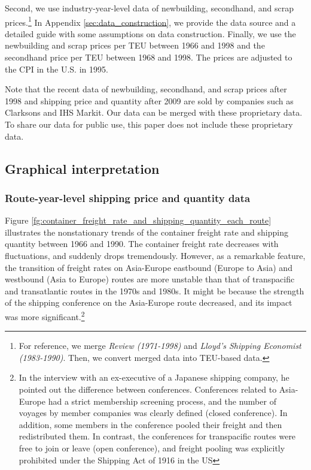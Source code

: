 \documentclass[11pt]{article}
\begin{document}
Second, we use industry-year-level data of newbuilding, secondhand, and scrap prices.\footnote{For reference, we merge \textit{Review (1971-1998)} and \textit{Lloyd's Shipping Economist (1983-1990)}. Then, we convert merged data into TEU-based data.} In Appendix \ref{sec:data_construction}, we provide the data source and a detailed guide with some assumptions on data construction. Finally, we use the newbuilding and scrap prices per TEU between 1966 and 1998 and the secondhand price per TEU between 1968 and 1998. The prices are adjusted to the CPI in the U.S. in 1995. 

Note that the recent data of newbuilding, secondhand, and scrap prices after 1998 and shipping price and quantity after 2009 are sold by companies such as Clarksons and IHS Markit. Our data can be merged with these proprietary data. To share our data for public use, this paper does not include these proprietary data.

\subsection{Graphical interpretation}\label{subsec:graphical_interpretation}
\subsubsection{Route-year-level shipping price and quantity data}



Figure \ref{fg:container_freight_rate_and_shipping_quantity_each_route} illustrates the nonstationary trends of the container freight rate and shipping quantity between 1966 and 1990. The container freight rate decreases with fluctuations, and suddenly drops tremendously. However, as a remarkable feature, the transition of freight rates on Asia-Europe eastbound (Europe to Asia) and westbound (Asia to Europe) routes are more unstable than that of transpacific and transatlantic routes in the 1970s and 1980s. It might be because the strength of the shipping conference on the Asia-Europe route decreased, and its impact was more significant.\footnote{In the interview with an ex-executive of a Japanese shipping company, he pointed out the difference between conferences. Conferences related to Asia-Europe had a strict membership screening process, and the number of voyages by member companies was clearly defined (closed conference). In addition, some members in the conference pooled their freight and then redistributed them. In contrast, the conferences for transpacific routes were free to join or leave (open conference), and freight pooling was explicitly prohibited under the Shipping Act of 1916 in the US} 
\end{document}
